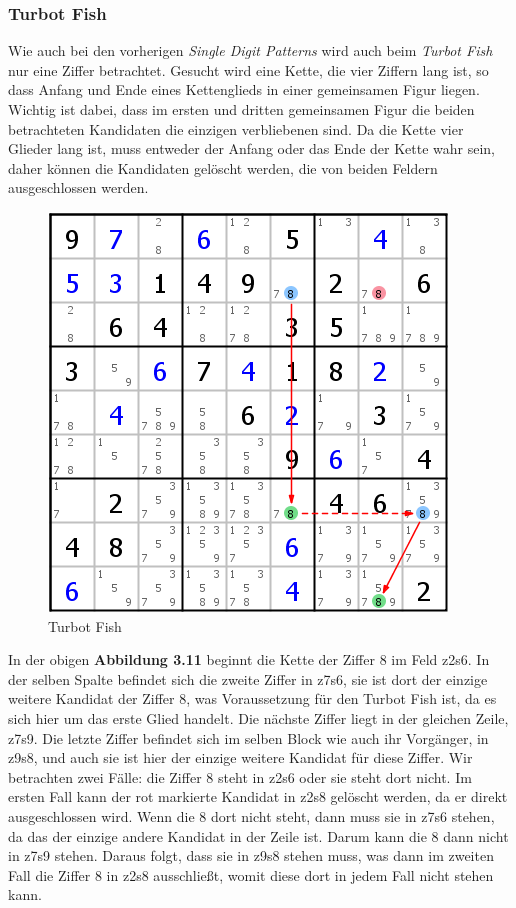 \newpage
\subsubsection{Turbot Fish}
Wie auch bei den vorherigen \textit{Single Digit Patterns} wird auch beim \textit{Turbot Fish} nur eine Ziffer betrachtet. Gesucht wird eine Kette, die vier Ziffern lang ist, so dass Anfang und Ende eines Kettenglieds in einer gemeinsamen Figur liegen. Wichtig ist dabei, dass im ersten und dritten gemeinsamen Figur die beiden betrachteten Kandidaten die einzigen verbliebenen  sind. Da die Kette vier Glieder lang ist, muss entweder der Anfang oder das Ende der Kette wahr sein, daher können die Kandidaten gelöscht werden, die von beiden Feldern ausgeschlossen werden.

\begin{figure}[h]
\begin{center}
\includegraphics{./img/turbot_fish.png}
\caption{Turbot Fish}
\end{center}
\end{figure}

In der obigen \textbf{Abbildung 3.11} beginnt die Kette der Ziffer 8 im Feld z2s6. In der selben Spalte befindet sich die zweite Ziffer in z7s6, sie ist dort der einzige weitere Kandidat der Ziffer 8, was Voraussetzung für den Turbot Fish ist, da es sich hier um das erste Glied handelt. Die nächste Ziffer liegt in der gleichen Zeile, z7s9. Die letzte Ziffer befindet sich im selben Block wie auch ihr Vorgänger, in z9s8, und auch sie ist hier der einzige weitere Kandidat für diese Ziffer. Wir betrachten zwei Fälle: die Ziffer 8 steht in z2s6 oder sie steht dort nicht. Im ersten Fall kann der rot markierte Kandidat in z2s8 gelöscht werden, da er direkt ausgeschlossen wird. Wenn die 8 dort nicht steht, dann muss sie in z7s6 stehen, da das der einzige andere Kandidat in der Zeile ist. Darum kann die 8 dann nicht in z7s9 stehen. Daraus folgt, dass sie in z9s8 stehen muss, was dann im zweiten Fall die Ziffer 8 in z2s8 ausschließt, womit diese dort in jedem Fall nicht stehen kann.